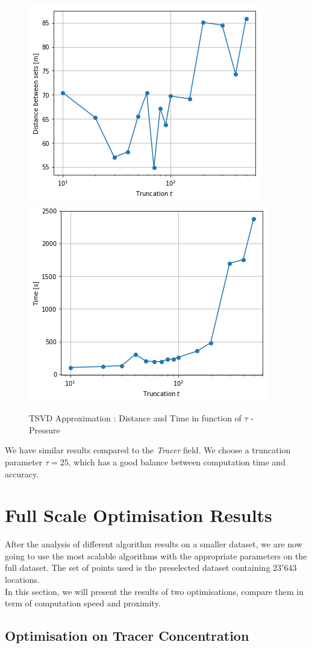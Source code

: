 \begin{figure}[h]
\centering
\includegraphics[height=0.33\linewidth]{figures/CompAlg/tsvd/dist_trunc_pressure}
~
\includegraphics[height=0.33\linewidth]{figures/CompAlg/tsvd/time_trunc_pressure}
\caption{TSVD Approximation : Distance and Time in function of $\tau$ - Pressure}
\label{fig:small_set:tsvd:pressure}
\end{figure}

We have similar results compared to the \textit{Tracer} field. We choose a truncation parameter $\tau=25$, which has a good balance between computation time and accuracy. 


\section{Full Scale Optimisation Results}

After the analysis of different algorithm results on a smaller dataset, we are now going to use the most scalable algorithms with the appropriate parameters on the full dataset. The set of points used is the preselected dataset containing $23'643$ locations. \\

In this section, we will present the results of two optimisations, compare them in term of computation speed and proximity. 


\subsection{Optimisation on Tracer Concentration}


